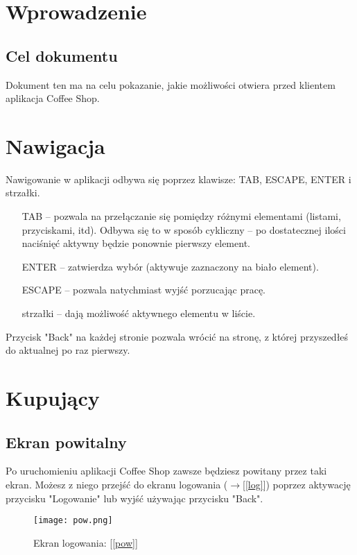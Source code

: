 


\tableofcontents
\clearpage
\section{Wprowadzenie}
\subsection{Cel dokumentu}
Dokument ten ma na celu pokazanie, jakie możliwości otwiera przed klientem aplikacja Coffee Shop.
\section{Nawigacja}
Nawigowanie w aplikacji odbywa się poprzez klawisze: TAB, ESCAPE, ENTER i strzałki. \begin{itemize}
  \item[TAB] -- pozwala na przełączanie się pomiędzy różnymi elementami (listami, przyciskami, itd). Odbywa się to w sposób cykliczny -- po dostatecznej ilości naciśnięć aktywny będzie ponownie pierwszy element.
  \item[ENTER] -- zatwierdza wybór (aktywuje zaznaczony na biało element).
  \item[ESCAPE] -- pozwala natychmiast wyjść porzucając pracę.
  \item[strzałki] -- dają możliwość aktywnego elementu w liście.
\end{itemize}
Przycisk "Back" na każdej stronie pozwala wrócić na stronę, z której przyszedłeś do aktualnej po raz pierwszy.
\section{Kupujący}
\subsection{Ekran powitalny}
Po uruchomieniu aplikacji Coffee Shop zawsze będziesz powitany przez taki ekran. Możesz z niego przejść do ekranu logowania ($\rightarrow$[\ref{log}]) poprzez aktywację przycisku "Logowanie" lub wyjść używając przycisku "Back".
\label{pow}
\begin{figure}
  \centering
  \texttt{[image: pow.png]}
  \caption{Ekran logowania: [\ref{pow}]}
  \label{powI}
\end{figure}

